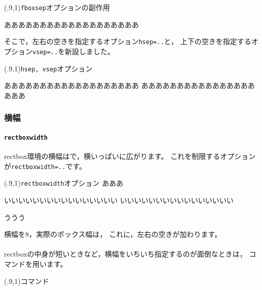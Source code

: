 \begin{showEx}(.9,1){\texttt{fboxsep}オプションの副作用}
\begin{rectbox}[fboxsep=1\zw]
あああああああああああああああああああ

\end{rectbox}

\end{showEx}

そこで，左右の空きを指定するオプション\verb+hsep=..+と，
上下の空きを指定するオプション\verb+vsep=..+を新設しました。

\begin{showEx}(.9,1){\texttt{hsep, vsep}オプション}
\begin{rectbox}[hsep=3\zw,vsep=1\zw]
あああああああああああああああああああ
あああああああああああああああああああ

\end{rectbox}

\end{showEx}

\subsubsection{横幅}
\paragraph{\texttt{rectboxwidth}}
\textsf{rectbox}環境の横幅はで，横いっぱいに広がります。
これを制限するオプションが\verb+rectboxwidth=..+です。

\begin{showEx}(.9,1){\texttt{rectboxwidth}オプション}
あああ
\begin{rectbox}[rectboxwidth=8\zw]
いいいいいいいいいいいいいいいい
いいいいいいいいいいいいいいいい
\end{rectbox}

ううう
\end{showEx}

横幅を8，実際のボックス幅は，
これに，左右の空きが加わります。

\paragraph{}
\textsf{rectbox}の中身が短いときなど，横幅をいちいち指定するのが面倒なときは，
コマンドを用います。

\begin{showEx}(.9,1){コマンド}
\end{showEx}

